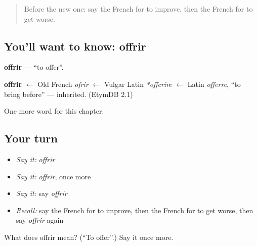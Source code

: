\begin{quote}
Before the new one: say the French for to improve, then the French for to get worse.
\end{quote}

\subsection*{You'll want to know: offrir}
\textbf{offrir} — \textquotedblleft{}to offer\textquotedblright{}.

\begin{cousinweb}
\textbf{offrir} $\leftarrow$ Old French \emph{ofrir} $\leftarrow$ Vulgar Latin \emph{*offerire} $\leftarrow$ Latin \emph{offerre}, \textquotedblleft{}to bring before\textquotedblright{} — inherited. (EtymDB 2.1)
\end{cousinweb}

\begin{grammarlens}[title={What you've built}]
One more word for this chapter.
\end{grammarlens}

\subsection*{Your turn}
\begin{itemize}
\raggedright
  \item \emph{Say it:} \emph{offrir}
  \item \emph{Say it:} \emph{offrir}, once more
  \item \emph{Say it:} say \emph{offrir}
  \item \emph{Recall:} say the French for to improve, then the French for to get worse, then say \emph{offrir} again
\end{itemize}

\begin{tcolorbox}[breakable,colback=teal!4,colframe=teal!35!black,title={Before you move on}]
What does offrir mean? (\textquotedblleft{}To offer\textquotedblright{}.) Say it once more.
\end{tcolorbox}
